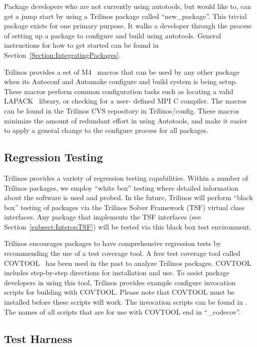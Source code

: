 \documentclass[12pt,relax]{TrilinosDevGuide}
\begin{document}
Package developers who are not currently using autotools, but would like
to, can get a jump start by using a Trilinos package called 
``new\_package''.  This trivial package exists for one primary purpose.  
It walks a developer through the process of setting up a package to 
configure and build using autotools.  General instructions for how to get 
started can be found in Section~\ref{Section:IntegratingPackages}.

Trilinos provides a set of M4~\cite{M4} macros that can be used by any other
package when its Autoconf and Automake configure and build system is being 
setup.  These macros perform common configuration tasks such as
locating a valid LAPACK~\cite{lapack} library, or checking for a user-
defined MPI C compiler.  The macros can be found in the Trilinos CVS 
repository in Trilinos/config.  These macros minimize the amount of redundant
 effort in using Autotools, and make it easier to apply a general change to 
the configure process for all packages.
\subsection{Regression Testing}
\label{subsect:RegressionTesting}
Trilinos provides a variety of regression
testing capabilities.  Within a number of Trilinos packages, we employ
``white box'' testing where detailed information about the software is
used and probed.  In the future, Trilinos will perform ``black box'' testing
of packages via the Trilinos Solver Framework (TSF) virtual class
interfaces.  Any package that implements the TSF interfaces (see
Section~\ref{subsect:InteropTSF}) will be tested via this black box
test environment.

Trilinos encourages packages to have comprehensive regression tests by 
recommending the use of a test coverage tool.  A free test coverage tool 
called COVTOOL~\cite{COVTOOL} has been used in the past to analyze Trilinos 
packages.  COVTOOL includes step-by-step directions for installation and use.
To assist package developers in using this tool, Trilinos provides example 
configure invocation scripts for building with COVTOOL.  Please note that 
COVTOOL must be installed before these scripts will work.  The invocation 
scripts can be found in \newline
{}.  The names 
of all scripts that are for use with COVTOOL end in ``\_codecov''.

\subsection{Test Harness}
\label{subsect:TestHarness}
\end{document}
